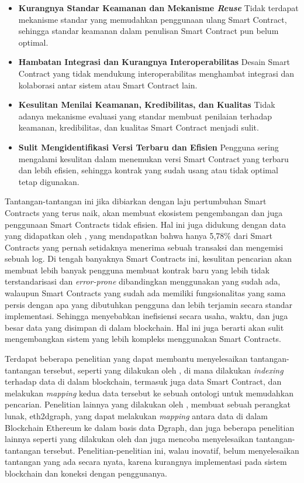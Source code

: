 \begin{itemize}
	\item \textbf{Kurangnya Standar Keamanan dan Mekanisme \textit{Reuse}} \newline
	      Tidak terdapat mekanisme standar yang memudahkan penggunaan ulang Smart Contract, sehingga standar keamanan dalam penulisan Smart Contract pun belum optimal.
	\item \textbf{Hambatan Integrasi dan Kurangnya Interoperabilitas} \newline
	      Desain Smart Contract yang tidak mendukung interoperabilitas menghambat integrasi dan kolaborasi antar sistem atau Smart Contract lain.
	\item \textbf{Kesulitan Menilai Keamanan, Kredibilitas, dan Kualitas} \newline
	      Tidak adanya mekanisme evaluasi yang standar membuat penilaian terhadap keamanan, kredibilitas, dan kualitas Smart Contract menjadi sulit.
	\item \textbf{Sulit Mengidentifikasi Versi Terbaru dan Efisien} \newline
	      Pengguna sering mengalami kesulitan dalam menemukan versi Smart Contract yang terbaru dan lebih efisien, sehingga kontrak yang sudah usang atau tidak optimal tetap digunakan.
\end{itemize}

Tantangan-tantangan ini jika dibiarkan dengan laju pertumbuhan Smart Contracts yang terus naik, akan membuat ekosistem pengembangan dan juga penggunaan Smart Contracts tidak efisien. Hal ini juga didukung dengan data yang didapatkan oleh \cite{aimar2023extraction}, yang mendapatkan bahwa hanya 5,78\% dari Smart Contracts yang pernah setidaknya menerima sebuah transaksi dan mengemisi sebuah log. Di tengah banyaknya Smart Contracts ini, kesulitan pencarian akan membuat lebih banyak pengguna membuat kontrak baru yang lebih tidak terstandarisasi dan \textit{error-prone} dibandingkan menggunakan yang sudah ada, walaupun Smart Contracts yang sudah ada memiliki fungsionalitas yang sama persis dengan apa yang dibutuhkan pengguna dan lebih terjamin secara standar implementasi. Sehingga menyebabkan inefisiensi secara usaha, waktu, dan juga besar data yang disimpan di dalam blockchain. Hal ini juga berarti akan sulit mengembangkan sistem yang lebih kompleks menggunakan Smart Contracts.

Terdapat beberapa penelitian yang dapat membantu menyelesaikan tantangan-tantangan tersebut, seperti yang dilakukan oleh \cite{third2017linked}, di mana dilakukan \textit{indexing} terhadap data di dalam blockchain, termasuk juga data Smart Contract, dan melakukan \textit{mapping} kedua data tersebut ke sebuah ontologi untuk memudahkan pencarian. Penelitian lainnya yang dilakukan oleh \cite{aimar2023extraction}, membuat sebuah perangkat lunak, eth2dgraph, yang dapat melakukan \textit{mapping} antara data di dalam Blockchain Ethereum ke dalam basis data Dgraph, dan juga beberapa penelitian lainnya seperti yang dilakukan oleh \cite{baqa2019semantic} dan \cite{cano2021toward} juga mencoba menyelesaikan tantangan-tantangan tersebut. Penelitian-penelitian ini, walau inovatif, belum menyelesaikan tantangan yang ada secara nyata, karena kurangnya implementasi pada sistem blockchain dan koneksi dengan penggunanya.

